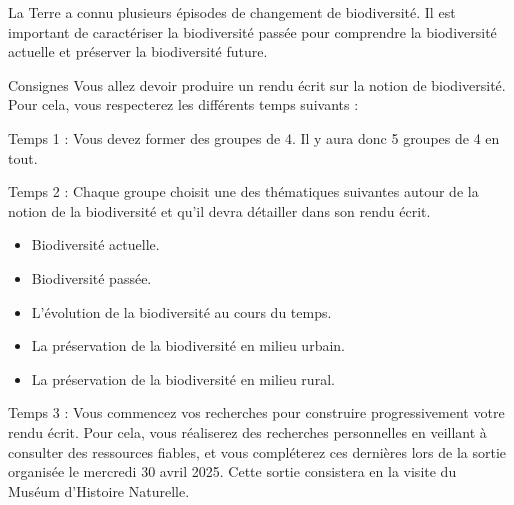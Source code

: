 \teteSndAP
\vspace*{-36pt}

\begin{contexte}
  La Terre a connu plusieurs épisodes de changement de biodiversité.
  Il est important de caractériser la biodiversité passée pour comprendre la biodiversité actuelle et préserver la biodiversité future.
\end{contexte}

\begin{doc}{Consignes}
Vous allez devoir produire un rendu écrit sur la notion de biodiversité. 
Pour cela, vous respecterez les différents temps suivants :
\begin{listePoints}
\item Temps 1 : Vous devez former des groupes de 4. Il y aura donc 5 groupes de 4 en tout.
\item Temps 2 : Chaque groupe choisit une des thématiques suivantes autour de la notion de la biodiversité et qu’il devra détailler dans son rendu écrit. 
\begin{itemize}
\item Biodiversité actuelle.
\item Biodiversité passée.
\item L’évolution de la biodiversité au cours du temps.
\item La préservation de la biodiversité en milieu urbain.
\item La préservation de la biodiversité en milieu rural.
\end{itemize}
\item Temps 3 : Vous commencez vos recherches pour construire progressivement votre rendu écrit. Pour cela, vous réaliserez des recherches personnelles en veillant à consulter des ressources fiables, et vous compléterez ces dernières lors de la sortie organisée le mercredi 30 avril 2025. Cette sortie consistera en la visite du Muséum d’Histoire Naturelle.
\end{listePoints}    
\end{doc}

